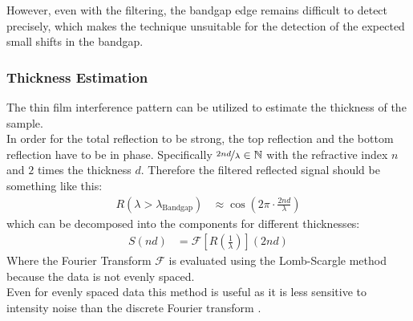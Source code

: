 \documentclass[
	oneside,
	parskip=half,
	a4paper,
]{scrbook}
\begin{document}
However, even with the filtering, the bandgap edge remains difficult to detect precisely, which makes the technique unsuitable for the detection of the expected small shifts in the bandgap.

\subsubsection{Thickness Estimation}
\label{sec:thickness}
The thin film interference pattern can be utilized to estimate the thickness of the sample.\\
In order for the total reflection to be strong, the top reflection and the bottom reflection have to be in phase.
Specifically $\nicefrac{2nd}{\lambda}\in\mathbb{N} $ with the refractive index $n$ and $2$ times the thickness $d$.
Therefore the filtered reflected signal should be something like this:
\begin{align}
	R(\lambda > \lambda_\text{Bandgap}) &\approx \cos \left( 2 \pi \cdot \frac{2 n d}{\lambda} \right)
\end{align}
which can be decomposed into the components for different thicknesses:
\begin{align}
	S(nd) &= \mathcal{F}\left[ R\left(\frac{1}{\lambda}\right)\right]( 2 nd)
\end{align}
Where the Fourier Transform $\mathcal{F}$ is evaluated using the Lomb-Scargle method \cite{scargle} because the data is not evenly spaced.\\
Even for evenly spaced data this method is useful as it is less sensitive to intensity noise than the discrete Fourier transform \cite{scargle}.
\end{document}

